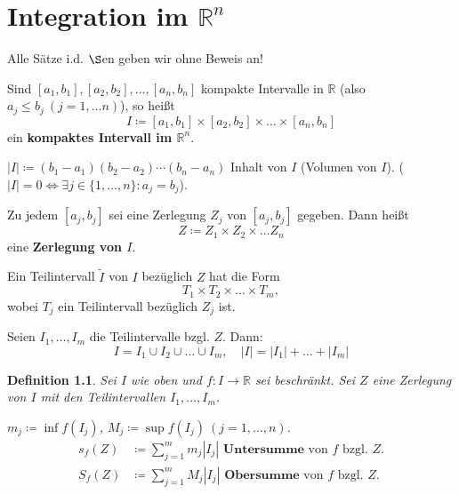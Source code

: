 \documentclass[12pt]{extreport} %
\newcommand{\R}{\mathbb{R}}
\theoremstyle{named}
\theoremstyle{nnamed}
\theoremstyle{itshape}
\newtheorem*{definition}{Definition}
\theoremstyle{normal}
\begin{document}
\chapter{Integration im \texorpdfstring{$\R^{n}$}{Rn}}

Alle Sätze i.d. $\S$en geben wir ohne Beweis an! 

\bigskip

Sind $[a_{1}, b_{1}], [a_{2}, b_{2}], \dotsc, [a_{n}, b_{n}]$ kompakte Intervalle in $\R$ (also $a_{j} \leq b_{j} ~(j = 1, \dotsc n)$), so hei{\ss}t
	$$ I \coloneqq [a_{1}, b_{1}] \times [a_{2}, b_{2}] \times \dotsc \times [a_{n}, b_{n}] $$
ein \textbf{kompaktes Intervall im $\R^{n}$}. 
	
\bigskip

$|I| \coloneqq (b_{1} - a_{1}) (b_{2} - a_{2}) \cdots (b_{n} - a_{n})$ Inhalt von $I$ (Volumen von $I$). ($|I| = 0 \iff \exists j \in \{1, \dotsc, n \}: a_{j} = b_{j}$). 

\bigskip

Zu jedem $[a_{j}, b_{j}]$ sei eine Zerlegung $Z_{j}$ von $[a_{j}, b_{j}]$ gegeben. Dann hei{\ss}t 
	$$ Z \coloneqq Z_{1} \times Z_{2} \times \dotsc Z_{n} $$
eine \textbf{Zerlegung von $I$}.

\bigskip

Ein Teilintervall $\tilde{I}$ von $I$ bezüglich $Z$ hat die Form
	$$ T_{1} \times T_{2} \times \dotsc \times T_{m}, $$
wobei $T_{j}$ ein Teilintervall bezüglich $Z_{j}$ ist.

\bigskip

Seien $I_{1}, \dotsc, I_{m}$ die Teilintervalle bzgl. $Z$. Dann:
	$$ I = I_{1} \cup I_{2} \cup \dotsc \cup I_{m}, \quad |I| = |I_{1}| + \dotsc + |I_{m}| $$

 
\begin{definition}
	Sei $I$ wie oben und $f \colon I \rightarrow \R$ sei beschränkt. Sei $Z$ eine Zerlegung von $I$ mit den Teilintervallen $I_{1}, \dotsc, I_{m}$. 
	
	\bigskip
	
	$m_{j} \coloneqq \inf f(I_{j})$, $M_{j} \coloneqq \sup f(I_{j}) ~(j = 1, \dotsc, n)$.
	\begin{align*}
		s_{f}(Z) & \coloneqq \sum_{j=1}^{m} m_{j} |I_{j}| \textbf{ Untersumme} \text{ von } f  \text{ bzgl. } Z. \\
		S_{f}(Z) & \coloneqq \sum_{j=1}^{m} M_{j} |I_{j}| \textbf{ Obersumme} \text{ von } f  \text{ bzgl. } Z.
	\end{align*}
\end{definition}
\end{document}

